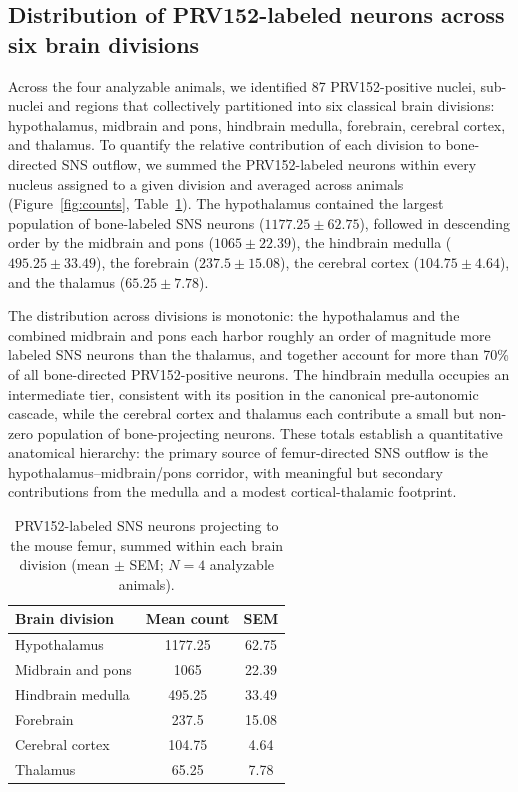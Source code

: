 \documentclass[11pt]{article}
\begin{document}
\subsection{Distribution of PRV152-labeled neurons across six brain divisions}

Across the four analyzable animals, we identified 87 PRV152-positive nuclei, sub-nuclei and regions that collectively partitioned into six classical brain divisions: hypothalamus, midbrain and pons, hindbrain medulla, forebrain, cerebral cortex, and thalamus. To quantify the relative contribution of each division to bone-directed SNS outflow, we summed the PRV152-labeled neurons within every nucleus assigned to a given division and averaged across animals (Figure~\ref{fig:counts}, Table~\ref{tab:counts}). The hypothalamus contained the largest population of bone-labeled SNS neurons ($1177.25 \pm 62.75$), followed in descending order by the midbrain and pons ($1065 \pm 22.39$), the hindbrain medulla ($495.25 \pm 33.49$), the forebrain ($237.5 \pm 15.08$), the cerebral cortex ($104.75 \pm 4.64$), and the thalamus ($65.25 \pm 7.78$).

The distribution across divisions is monotonic: the hypothalamus and the combined midbrain and pons each harbor roughly an order of magnitude more labeled SNS neurons than the thalamus, and together account for more than 70\% of all bone-directed PRV152-positive neurons. The hindbrain medulla occupies an intermediate tier, consistent with its position in the canonical pre-autonomic cascade, while the cerebral cortex and thalamus each contribute a small but non-zero population of bone-projecting neurons. These totals establish a quantitative anatomical hierarchy: the primary source of femur-directed SNS outflow is the hypothalamus--midbrain/pons corridor, with meaningful but secondary contributions from the medulla and a modest cortical-thalamic footprint.

\begin{table}[htbp]
\centering
\caption{PRV152-labeled SNS neurons projecting to the mouse femur, summed within each brain division (mean $\pm$ SEM; $N=4$ analyzable animals).}
\label{tab:counts}
\begin{tabular}{lcc}
\toprule
Brain division & Mean count & SEM \\
\midrule
Hypothalamus & 1177.25 & 62.75 \\
Midbrain and pons & 1065 & 22.39 \\
Hindbrain medulla & 495.25 & 33.49 \\
Forebrain & 237.5 & 15.08 \\
Cerebral cortex & 104.75 & 4.64 \\
Thalamus & 65.25 & 7.78 \\
\bottomrule
\end{tabular}
\end{table}
\end{document}
